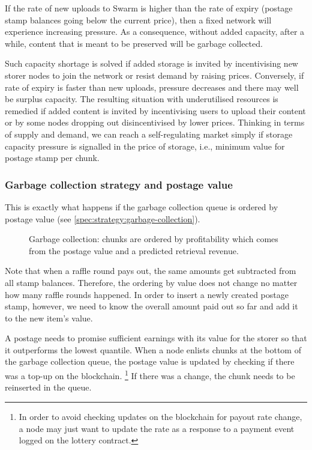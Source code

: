 If the rate of new uploads to Swarm is higher than the rate of expiry (postage stamp balances going below the current price), then a fixed network  will experience increasing pressure. As a consequence, without added capacity, after a while, content that is meant to be preserved will be garbage collected. 

Such capacity shortage is solved if added storage is invited by incentivising new storer nodes to join the network or resist demand by raising prices.  Conversely, if rate of expiry is faster than new uploads, pressure decreases and there may well be surplus capacity. The resulting situation with underutilised resources is remedied if added content is invited by incentivising users to upload their content or by some nodes dropping out disincentivised by lower prices. Thinking in terms of supply and demand, we can reach a self-regulating market simply if storage capacity pressure is signalled in the price of storage, i.e., minimum value for postage stamp per chunk. 

\subsubsection{Garbage collection strategy and postage value}

This is exactly what happens if the garbage collection queue is ordered by postage value (see \ref{spec:strategy:garbage-collection}).

\begin{figure}[htbp]
  \centering
  \caption{Garbage collection: chunks are ordered by  profitability which comes from the postage value and a predicted retrieval revenue.}
  \label{fig:garbage-collection}
\end{figure}


Note that when a raffle round pays out, the same amounts get subtracted from all stamp balances. Therefore, the ordering by value does not change no matter how many raffle rounds happened. In order to insert a newly created postage stamp, however, we need to know the overall amount paid out so far and add it to the new item's value.

A postage needs to promise sufficient earnings with its value for the storer so that it outperforms the lowest quantile. When a node enlists chunks at the bottom of the garbage collection queue, the postage value is updated by checking if there was a top-up on the blockchain.%
%
\footnote{In order to avoid checking updates on the blockchain for payout rate change, a node may just want to update the rate as a response to a payment event logged on the lottery contract.}
%
If there was a change, the  chunk needs to be reinserted in the queue. 

